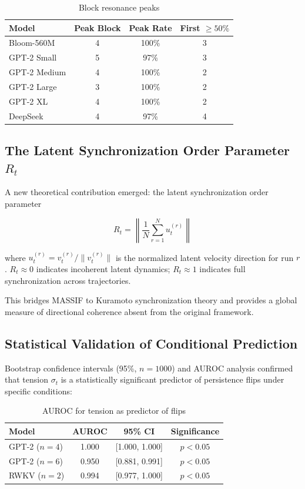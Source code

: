 \documentclass[12pt,a4paper]{article}
\begin{document}
\begin{table}[H]
\centering
\caption{Block resonance peaks}
\label{tab:addendum_block}
\begin{tabular}{lccc}
\toprule
Model & Peak Block & Peak Rate & First $\geq 50\%$ \\
\midrule
Bloom-560M & 4 & 100\% & 3 \\
GPT-2 Small & 5 & 97\% & 3 \\
GPT-2 Medium & 4 & 100\% & 2 \\
GPT-2 Large & 3 & 100\% & 2 \\
GPT-2 XL & 4 & 100\% & 2 \\
DeepSeek & 4 & 97\% & 4 \\
\bottomrule
\end{tabular}
\end{table}

\subsection{\texorpdfstring{The Latent Synchronization Order Parameter $R_t$}{The Latent Synchronization Order Parameter R_t}}

A new theoretical contribution emerged: the latent synchronization order parameter

$$R_t = \left\| \frac{1}{N} \sum_{r=1}^{N} u_t^{(r)} \right\|$$

where $u_t^{(r)} = v_t^{(r)}/\|v_t^{(r)}\|$ is the normalized latent velocity direction for run $r$. $R_t \approx 0$ indicates incoherent latent dynamics; $R_t \approx 1$ indicates full synchronization across trajectories.

This bridges MASSIF to Kuramoto synchronization theory and provides a global measure of directional coherence absent from the original framework.

\subsection{Statistical Validation of Conditional Prediction}

Bootstrap confidence intervals (95\%, $n=1000$) and AUROC analysis confirmed that tension $\sigma_t$ is a statistically significant predictor of persistence flips under specific conditions:

\begin{table}[H]
\centering
\caption{AUROC for tension as predictor of flips}
\label{tab:addendum_auroc}
\begin{tabular}{lccc}
\toprule
Model & AUROC & 95\% CI & Significance \\
\midrule
GPT-2 ($n=4$) & 1.000 & [1.000, 1.000] & $p < 0.05$ \\
GPT-2 ($n=6$) & 0.950 & [0.881, 0.991] & $p < 0.05$ \\
RWKV ($n=2$) & 0.994 & [0.977, 1.000] & $p < 0.05$ \\
\bottomrule
\end{tabular}
\end{table}
\end{document}
